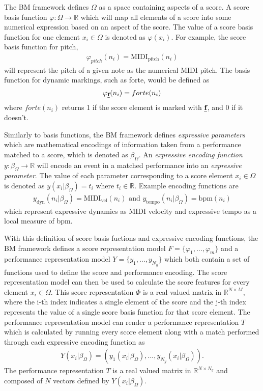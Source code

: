 \newcommand{\mperf}{\beta_{\Omega}}

The BM framework defines $\Omega$ as a space containing aspects of a score. A score basis function $\varphi: \Omega \rightarrow \mathbb{R}$ which will map all elements of a score into some numerical expression based on an aspect of the score. The value of a score basis function for one element $x_i \in \Omega$ is denoted as $\varphi (x_i)$. For example, the score basis function for pitch, 
\begin{align*}
\varphi_{pitch} (n_i) = \textrm{MIDI}_{\textrm{pitch}}(n_i)   
\end{align*}
will represent the pitch of a given note as the numerical MIDI pitch. The basis function for dynamic markings, such as forte, would be defined as 
\begin{align*}
\varphi_{\textbf{\emph{f}}} (n_i) = forte(n_i)   
\end{align*}
where $forte(n_i)$ returns 1 if the score element is marked with $\textbf{\emph{f}}$, and 0 if it doesn't. 

Similarly to basis functions, the BM framework defines \emph{expressive parameters} which are mathematical encodings of information taken from a performance matched to a score, which is denoted as $\mperf$. An \emph{expressive encoding function} $y: \mperf \rightarrow \mathbb{R}$ will encode an event in a matched performance into an \emph{expressive parameter}. The value of each parameter corresponding to a score element $x_{i} \in \Omega$ is denoted as $y(x_i \vert \mperf) = t_i$ where $t_i \in \mathbb{R}$. Example encoding functions are 
\begin{align*}
y_{\textrm{dyn}}(n_i \vert \mperf) = \textrm{MIDI}_{\textrm{vel}}(n_i) \textrm{ and } y_{\textrm{tempo}}(n_i \vert \mperf) = \textrm{bpm}(n_i)
\end{align*}
which represent expressive dynamics as MIDI velocity and expressive tempo as a local measure of bpm. 

With this definition of score basis fuctions and expressive encoding functions, the BM framework defines a score representation model $F = \{\varphi_1, ..., \varphi_m\}$ and a performance representation model $Y = \{y_1, ..., y_{N_y}\}$ which both contain a set of functions used to define the score and performance encoding. The score representation model can then be used to calculate the score features for every element $x_i \in \Omega$. This score representation $\Phi$ is a real valued matrix in $\mathbb{R}^{N \times M}$, where the i-th index indicates a single element of the score and the j-th index represents the value of a single score basis function for that score element. The performance representation model can render a performance representation $T$ which is calculated by running every score element along with a match performed through each expressive encoding function as 
\begin{align*}
Y(x_i \vert \mperf) = (y_1(x_i \vert \mperf), ... ,y_{N_y}(x_i \vert \mperf)).
\end{align*}
The performance representation $T$ is a real valued matrix in $\mathbb{R}^{N \times N_y}$ and composed of $N$ vectors defined by $Y(x_i \vert \mperf)$. 

